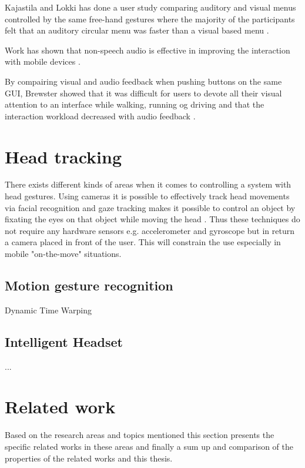 Kajastila and Lokki has done a user study comparing auditory and visual menus controlled by the same free-hand gestures where the majority of the participants felt that an auditory circular menu was faster than a visual based menu \cite{kajastila_interaction_2013}.

Work has shown that non-speech audio is effective in improving the interaction with mobile devices \cite{pirhonen_gestural_2002, sawhney_nomadic_2000}.

By compairing visual and audio feedback when pushing buttons on the same GUI, Brewster showed that it was difficult for users to devote all their visual attention to an interface while walking, running og driving and that the interaction workload decreased with audio feedback \cite{brewster_overcoming_2002}.


\section{Head tracking}
There exists different kinds of areas when it comes to controlling a system with head gestures. Using cameras it is possible to effectively track head movements via facial recognition \cite{morimoto_recognition_1996} and gaze tracking makes it possible to control an object by fixating the eyes on that object while moving the head \cite{mardanbegi_eye-based_2012}. Thus these techniques do not require any hardware sensors e.g. accelerometer and gyroscope but in return a camera placed in front of the user. This will constrain the use especially in mobile "on-the-move" situations.

\subsection{Motion gesture recognition}
Dynamic Time Warping \cite{salvador_toward_2007}

\subsection{Intelligent Headset}
...


\section{Related work}
Based on the research areas and topics mentioned this section presents the specific related works in these areas and finally a sum up and comparison of the properties of the related works and this thesis.

